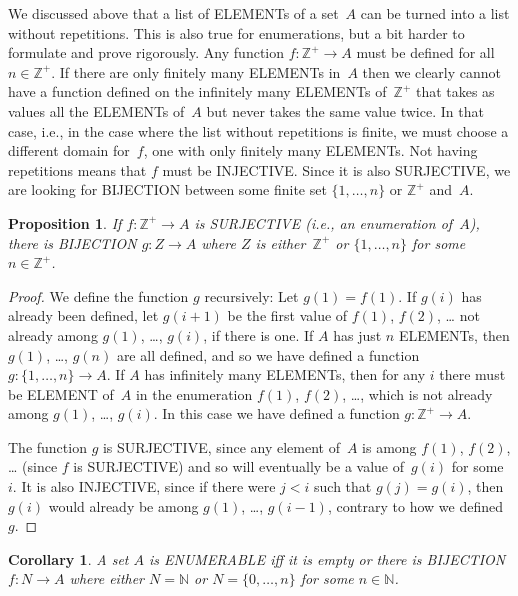 \documentclass[10pt,a4paper]{article}
\newcommand*{\olup}[1]{\MakeUppercase{#1}}
\theoremstyle{plain}
\newtheorem{prop}[thm]{Proposition}
\newtheorem{cor}[thm]{Corollary}
\theoremstyle{definition}
\theoremstyle{remark}
\newcommand*{\ollabel}[1]{\label{#1}}
\providecommand{\Nat}{\ensuremath{\mathbb{N}}}
\providecommand{\PosInt}{\mathbb{Z}^{+}}
\begin{document}
We discussed above that a list of \olup{element}s of a set~$A$ can be
turned into a list without repetitions. This is also true for
enumerations, but a bit harder to formulate and prove rigorously. Any
function $f\colon \PosInt \to A$ must be defined for all $n \in
\PosInt$. If there are only finitely many \olup{element}s in~$A$ then we
clearly cannot have a function defined on the infinitely many
\olup{element}s of~$\PosInt$ that takes as values all the \olup{element}s
of~$A$ but never takes the same value twice. In that case, i.e., in
the case where the list without repetitions is finite, we must choose
a different domain for~$f$, one with only finitely many \olup{element}s.
Not having repetitions means that $f$ must be \olup{injective}. Since it
is also \olup{surjective}, we are looking for \olup{bijection} between some
finite set $\{1, \dots, n\}$ or $\PosInt$ and~$A$.

\begin{prop}\ollabel{prop:enum-bij}
If $f\colon \PosInt \to A$ is \olup{surjective} (i.e., an enumeration
of~$A$), there is \olup{bijection} $g\colon Z \to A$ where $Z$ is
either~$\PosInt$ or $\{1, \dots, n\}$ for some~$n \in \PosInt$.
\end{prop}

\begin{proof}
  We define the function $g$ recursively: Let $g(1) = f(1)$. If $g(i)$
  has already been defined, let $g(i+1)$ be the first value of $f(1)$,
  $f(2)$, \dots{} not already among $g(1)$, \dots, $g(i)$, if there is
  one. If $A$ has just $n$ \olup{element}s, then $g(1)$, \dots, $g(n)$ are all
  defined, and so we have defined a function $g\colon \{1, \dots, n\}
  \to A$. If $A$ has infinitely many \olup{element}s, then for any $i$
  there must be \olup{element} of~$A$ in the enumeration $f(1)$, $f(2)$,
  \dots, which is not already among $g(1)$, \dots, $g(i)$. In this
  case we have defined a function $g\colon \PosInt \to A$.
  
  The function $g$ is \olup{surjective}, since any element of~$A$ is
  among $f(1)$, $f(2)$, \dots{} (since $f$ is \olup{surjective}) and so
  will eventually be a value of~$g(i)$ for some~$i$. It is also
  \olup{injective}, since if there were $j < i$ such that $g(j) = g(i)$,
  then $g(i)$ would already be among $g(1)$, \dots, $g(i-1)$, contrary
  to how we defined~$g$.
\end{proof}

\begin{cor}\ollabel{cor:enum-nat-bij}
A set $A$ is \olup{enumerable} iff it is empty or there is \olup{bijection}
$f\colon N \to A$ where either $N = \Nat$ or $N = \{0, \dots, n\}$ for
some $n \in \Nat$.
\end{cor}
\end{document}
